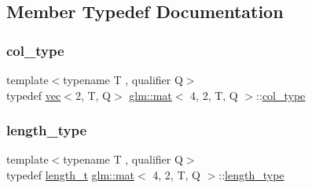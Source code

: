 \subsection{Member Typedef Documentation}
\mbox{\label{structglm_1_1mat_3_014_00_012_00_01_t_00_01_q_01_4_a60138ab077eb3bef96e654e672af5059}} 
\subsubsection{\texorpdfstring{col\+\_\+type}{col\_type}}
{\footnotesize\ttfamily template$<$typename T , qualifier Q$>$ \\
typedef \mbox{\hyperlink{structglm_1_1vec}{vec}}$<$2, T, Q$>$ \mbox{\hyperlink{structglm_1_1mat}{glm\+::mat}}$<$ 4, 2, T, Q $>$\+::\mbox{\hyperlink{structglm_1_1mat_3_014_00_012_00_01_t_00_01_q_01_4_a60138ab077eb3bef96e654e672af5059}{col\+\_\+type}}}

\mbox{\label{structglm_1_1mat_3_014_00_012_00_01_t_00_01_q_01_4_a4b192a2630331f70ca61657d9783026e}} 
\subsubsection{\texorpdfstring{length\+\_\+type}{length\_type}}
{\footnotesize\ttfamily template$<$typename T , qualifier Q$>$ \\
typedef \mbox{\hyperlink{namespaceglm_a090a0de2260835bee80e71a702492ed9}{length\+\_\+t}} \mbox{\hyperlink{structglm_1_1mat}{glm\+::mat}}$<$ 4, 2, T, Q $>$\+::\mbox{\hyperlink{structglm_1_1mat_3_014_00_012_00_01_t_00_01_q_01_4_a4b192a2630331f70ca61657d9783026e}{length\+\_\+type}}}

\mbox{\label{structglm_1_1mat_3_014_00_012_00_01_t_00_01_q_01_4_a33d6c2074d5507b728a6e2e91a84f6a8}} 
